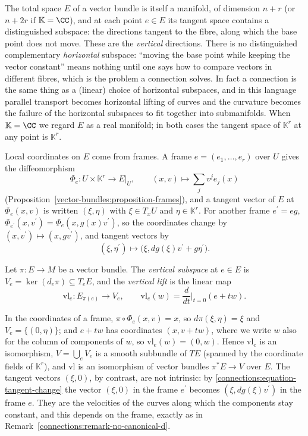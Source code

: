 The total space $E$ of a vector bundle is itself a manifold, of dimension $n + r$ (or $n + 2r$ if $\mathbb{K} = \CC$), and at each point $e \in E$ its tangent space contains a
distinguished subspace: the directions tangent to the fibre, along which the base point does not move. These are the \emph{vertical} directions. There is no distinguished complementary
\emph{horizontal} subspace: ``moving the base point while keeping the vector constant'' means nothing until one says how to compare vectors in different fibres, which is the problem a
connection solves. In fact a connection is the same thing as a (linear) choice of horizontal subspaces, and in this language parallel transport becomes horizontal lifting of curves and
the curvature becomes the failure of the horizontal subspaces to fit together into submanifolds. When $\mathbb{K} = \CC$ we regard $E$ as a real manifold; in both cases the tangent space of
$\mathbb{K}^r$ at any point is $\mathbb{K}^r$.

Local coordinates on $E$ come from frames. A frame $e = (e_1, \ldots, e_r)$ over $U$ gives the diffeomorphism
\[
\Phi_e \colon U \times \mathbb{K}^r \to E|_U, \qquad (x, v) \mapsto \sum_jv^je_j(x)
\]
(Proposition~\ref{vector-bundles:proposition-frames}), and a tangent vector of $E$ at $\Phi_e(x, v)$ is written $(\xi, \eta)$ with $\xi \in T_xU$ and $\eta \in \mathbb{K}^r$. For another frame
$e^{\prime} = eg$, $\Phi_{e^{\prime}}(x, v^{\prime}) = \Phi_e(x, g(x)v^{\prime})$, so the coordinates change by $(x, v^{\prime}) \mapsto (x, gv^{\prime})$, and tangent vectors by
\begin{equation}\label{connections:equation-tangent-change}
(\xi, \eta^{\prime}) \longmapsto \bigl(\xi, dg(\xi)v^{\prime} + g\eta^{\prime}\bigr).
\end{equation}

\begin{definition}\label{connections:definition-vertical}
Let $\pi \colon E \to M$ be a vector bundle. The \emph{vertical subspace} at $e \in E$ is $V_e = \ker(d_e\pi) \subseteq T_eE$, and the \emph{vertical lift} is the linear map
\[
\mathrm{vl}_e \colon E_{\pi(e)} \to V_e, \qquad \mathrm{vl}_e(w) = \frac{d}{dt}\Big|_{t=0}(e + tw).
\]
\end{definition}

In the coordinates of a frame, $\pi \circ \Phi_e(x, v) = x$, so $d\pi(\xi, \eta) = \xi$ and $V_e = \{(0, \eta)\}$; and $e + tw$ has coordinates $(x, v + tw)$, where we write $w$ also for the
column of components of $w$, so $\mathrm{vl}_e(w) = (0, w)$. Hence $\mathrm{vl}_e$ is an isomorphism, $V = \bigcup_eV_e$ is a smooth subbundle of $TE$ (spanned by the coordinate fields of
$\mathbb{K}^r$), and $\mathrm{vl}$ is an isomorphism of vector bundles $\pi^*E \to V$ over $E$. The tangent vectors $(\xi, 0)$, by contrast, are not intrinsic: by
\eqref{connections:equation-tangent-change} the vector $(\xi, 0)$ in the frame $e^{\prime}$ becomes $(\xi, dg(\xi)v^{\prime})$ in the frame $e$. They are the velocities of the curves along which
the components stay constant, and this depends on the frame, exactly as in Remark~\ref{connections:remark-no-canonical-d}.

